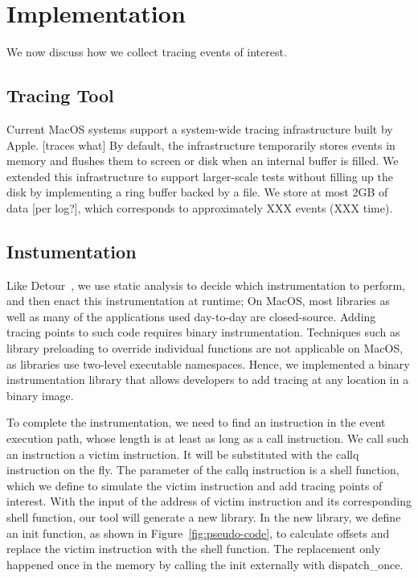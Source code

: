 \section{Implementation}
We now discuss how we collect tracing events of interest.

\subsection{Tracing Tool}
Current MacOS systems support a system-wide tracing infrastructure built by Apple. [traces what]
By default, the infrastructure temporarily stores events in memory and flushes them to screen or disk when an internal buffer is filled.
We extended this infrastructure to support larger-scale tests without filling up the disk by implementing a ring buffer backed by a file.
We store at most 2GB of data [per log?], which corresponds to approximately XXX events (XXX time).


\subsection{Instumentation}
Like Detour~\cite{detourXXXXXXXX}, we use static analysis to decide which instrumentation to perform, and then enact this instrumentation at runtime; 
On MacOS, most libraries as well as many of the applications used day-to-day are closed-source.
Adding tracing points to such code requires binary instrumentation.
Techniques such as library preloading to override individual functions are not applicable on MacOS, as libraries use two-level executable namespaces.
Hence, we implemented a binary instrumentation library that allows developers to add tracing at any location in a binary image.

To complete the instrumentation, we need to find an instruction in the event execution path, whose length is at least as long as a call instruction.
We call such an instruction a victim instruction.
It will be substituted with the callq instruction on the fly.
The parameter of the callq instruction is a shell function, which we define to simulate the victim instruction and add tracing points of interest.
With the input of the address of victim instruction and its corresponding shell function, our tool will generate a new library.
In the new library, we define an init function, as shown in Figure~\ref{fig:pseudo-code}, to calculate offsets and replace the victim instruction with the shell function.
The replacement only happened once in the memory by calling the init externally with dispatch\_once.


